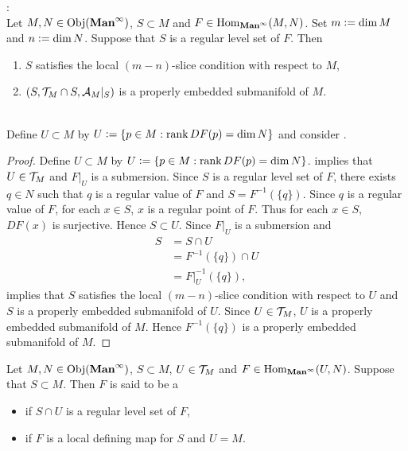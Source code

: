\documentclass{book}
\begin{document}
	\begin{ex}  : \\
		Let $M, N \in \operatorname{Obj}(\operatorname*{\text{\textbf{Man}}^{\infty}})$, $S \subset M$ and $F \in \operatorname{Hom}_{\operatorname*{\text{\textbf{Man}}^{\infty}}}(M,N)$. Set $m \vcentcolon= \dim M$ and $n \vcentcolon= \dim N$. Suppose that $S$ is a regular level set of $F$. Then
		\begin{enumerate}
			\item $S$ satisfies the local $(m-n)$-slice condition with respect to $M$,
			\item $(S, \mathcal{T}_M \cap S, \mathcal{A}_M|_S)$ is a properly embedded submanifold of $M$.
		\end{enumerate}
		 \\
		Define $U \subset M$ by $U \vcentcolon= \{p \in M: \operatorname{\text{rank}} DF(p) = \dim N\}$ and consider .
	\end{ex}

	\begin{proof}
		Define $U \subset M$ by $U \vcentcolon= \{p \in M: \operatorname{\text{rank}} DF(p) = \dim N\}$.  implies that $U \in \mathcal{T}_M$ and $F|_U$ is a submersion. Since $S$ is a regular level set of $F$, there exists $q \in N$ such that $q$ is a regular value of $F$ and $S = F^{-1}(\{q\})$. Since $q$ is a regular value of $F$, for each $x \in S$, $x$ is a regular point of $F$. Thus for each $x \in S$, $DF(x)$ is surjective. Hence $S \subset U$. Since $F|_U$ is a submersion and 
		\begin{align*}
			S
			& = S \cap U \\
			& = F^{-1}(\{q\}) \cap U \\
			& = F|_U^{-1}(\{q\}),
		\end{align*}
		 implies that $S$ satisfies the local $(m-n)$-slice condition with respect to $U$ and $S$ is a properly embedded submanifold of $U$. Since $U \in \mathcal{T}_M$, $U$ is a properly embedded submanifold of $M$. Hence $F^{-1}(\{q\})$ is a properly embedded submanifold of $M$. 
	\end{proof}

	\begin{defn} 
		Let $M, N \in \operatorname{Obj}(\operatorname*{\text{\textbf{Man}}^{\infty}})$, $S \subset M$, $U \in \mathcal{T}_M$ and $F \in \operatorname{Hom}_{\operatorname*{\text{\textbf{Man}}^{\infty}}}(U, N)$. Suppose that $S \subset M$. Then $F$ is said to be a 
		\begin{itemize}
			\item {} if $S \cap U$ is a regular level set of $F$, 
			\item {} if $F$ is a local defining map for $S$ and $U = M$.
		\end{itemize}
	\end{defn}
\end{document}
